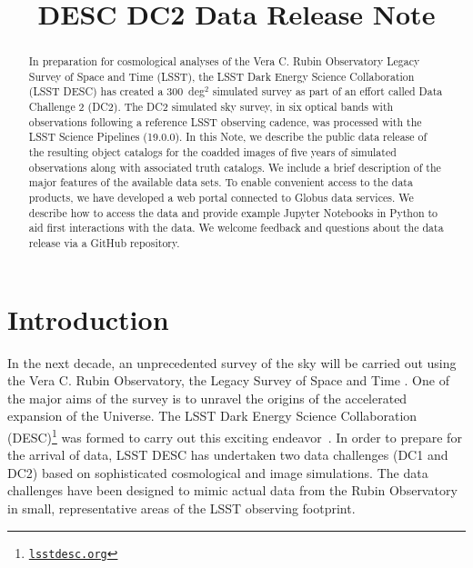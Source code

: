 \documentclass[modern]{descnote}
\newcommand*{\https}[1]{\href{https://#1}{\nolinkurl{#1}}}
\begin{document}
\title{DESC DC2 Data Release Note}


\begin{abstract}

In preparation for cosmological analyses of the Vera C. Rubin Observatory Legacy Survey of Space and Time (LSST), the LSST Dark Energy Science Collaboration (LSST DESC) has created a 300~deg$^2$ simulated survey as part of an effort called Data Challenge 2 (DC2).  The DC2 simulated sky survey, in six optical bands with observations following a reference LSST observing cadence, was processed with the LSST Science Pipelines (19.0.0).  In this Note, we describe the public data release of the resulting object catalogs for the coadded images of five years of simulated observations along with associated truth catalogs. We include a brief description of the major features of the available data sets. To enable convenient access to the data products, we have developed a web portal connected to Globus data services. We describe how to access the data and provide example Jupyter Notebooks in Python to aid first interactions with the data.  We welcome feedback and questions about the data release via a GitHub repository.

\clearpage
\end{abstract}

\tableofcontents

\clearpage

\section{Introduction}

In the next decade, an unprecedented survey of the sky will be carried out using the Vera C. Rubin Observatory, the Legacy Survey of Space and Time \citep{2009arXiv0912.0201L,2019ApJ...873..111I}. One of the major aims of the survey is to unravel the origins of the accelerated expansion of the Universe. The LSST Dark Energy Science Collaboration (DESC)\footnote{\https{lsstdesc.org}} was formed to carry out this exciting endeavor~\citep{Abate:2012za}. In order to prepare for the arrival of data, LSST DESC has undertaken two data challenges (DC1 and DC2) based on sophisticated cosmological and  image simulations. The data challenges have been designed to mimic actual data from the Rubin Observatory in small, representative areas of the LSST observing footprint.
\end{document}
